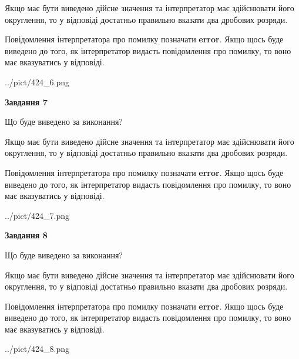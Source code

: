\documentclass[12pt, ukrainian]{article}
\begin{document}
{\begin {Large}
Якщо має бути виведено дійсне значення та інтерпретатор має здійснювати його округлення, 
то у відповіді достатньо правильно вказати два дробових розряди.

Повідомлення інтерпретатора про помилку позначати \textbf{error}.
Якщо щось буде виведено до того, як інтерпретатор видасть повідомлення про помилку, 
то воно має вказуватись у відповіді. \par

\begin{center}
	{../pict/424_6.png}
\end{center}
\newpage

{\begin {center}\textbf{Завдання 7}\end {center}}\par
Що буде виведено за виконання? \par

Якщо має бути виведено дійсне значення та інтерпретатор має здійснювати його округлення, 
то у відповіді достатньо правильно вказати два дробових розряди.

Повідомлення інтерпретатора про помилку позначати \textbf{error}.
Якщо щось буде виведено до того, як інтерпретатор видасть повідомлення про помилку, 
то воно має вказуватись у відповіді. \par

\begin{center}
	{../pict/424_7.png}
\end{center}
\newpage

{\begin {center}\textbf{Завдання 8}\end {center}}\par
Що буде виведено за виконання? \par

Якщо має бути виведено дійсне значення та інтерпретатор має здійснювати його округлення, 
то у відповіді достатньо правильно вказати два дробових розряди.

Повідомлення інтерпретатора про помилку позначати \textbf{error}.
Якщо щось буде виведено до того, як інтерпретатор видасть повідомлення про помилку, 
то воно має вказуватись у відповіді. \par

\begin{center}
	{../pict/424_8.png}
\end{center}
\newpage


\end{Large}}
\end{document}
